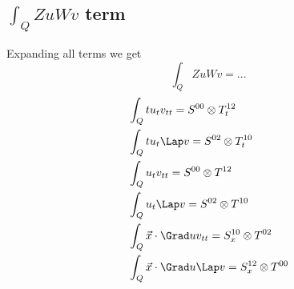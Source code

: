 \documentclass[]{report}
\begin{document}
    \subsection*{$\int_Q {Z}u {W}v$ term}
    Expanding all terms we get
    \begin{equation*}
        \int_Q Zu Wv = ...
    \end{equation*}
    \begin{align*}
        &\int_Q t u_t v_{tt} = S^{00} \otimes T^{12}_t \\
        &\int_Q t u_t \Lap v = S^{02} \otimes T^{10}_t \\
        &\int_Q u_t v_{tt} = S^{00} \otimes T^{12} \\
        &\int_Q u_t \Lap v = S^{02} \otimes T^{10} \\
        &\int_Q \vec{x} \cdot \Grad u v_{tt} = S^{10}_x \otimes T^{02} \\
        &\int_Q \vec{x} \cdot \Grad u \Lap v = S^{12}_x \otimes T^{00}
    \end{align*}

    
\end{document}
